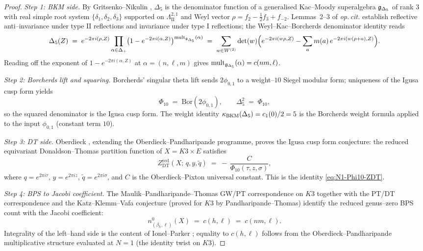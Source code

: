 \begin{proof}
\emph{Step 1: BKM side.} By Gritsenko--Nikulin \cite{GritsenkoNikulin1995, GritsenkoNikulin1998},
$\Delta_5$ is the denominator function of a generalised Kac--Moody superalgebra
$\mathfrak{g}_{\Delta_5}$ of rank $3$ with real simple root system $\{\delta_1, \delta_2, \delta_3\}$
supported on $\Lambda^{2,1}_{\mathrm{II}}$ and Weyl vector $\rho = f_2 - \tfrac12 f_3 + f_{-2}$.
Lemmas~2--3 of \emph{op.\,cit.} establish reflective anti--invariance under type
$\mathrm{II}$ reflections and invariance under type $\mathrm{I}$ reflections;
the Weyl--Kac--Borcherds denominator identity reads
\[
\Delta_5(Z) \;=\; e^{-2\pi i(\rho, Z)} \prod_{\alpha \in \Delta_+}\bigl(1 - e^{-2\pi i(\alpha, Z)}\bigr)^{\mathrm{mult}_{\mathfrak{g}_{\Delta_5}}(\alpha)}
\;=\; \sum_{w \in W^{(2)}}\mathrm{det}(w)\Bigl(e^{-2\pi i(w\rho, Z)} - \sum_a m(a)\, e^{-2\pi i (w(\rho + a), Z)}\Bigr).
\]
Reading off the exponent of $1 - e^{-2\pi i(\alpha, Z)}$ at
$\alpha = (n, \ell, m)$ gives $\mathrm{mult}_{\mathfrak{g}_{\Delta_5}}(\alpha) = c(nm, \ell)$.

\emph{Step 2: Borcherds lift and squaring.} Borcherds' singular theta lift
\cite[Thm~13.3]{Borcherds1998} sends $2\phi_{0,1}$ to a weight--$10$ Siegel
modular form; uniqueness of the Igusa cusp form yields
\[
\Phi_{10} \;=\; \mathrm{Bor}(2 \phi_{0,1}), \qquad \Delta_5^2 \;=\; \Phi_{10},
\]
so the squared denominator is the Igusa cusp form. The weight identity
$\kappa_{\mathrm{BKM}}(\Delta_5) = c_1(0)/2 = 5$ is the Borcherds weight formula applied to the
input $\phi_{0,1}$ (constant term $10$).

\emph{Step 3: DT side.} Oberdieck \cite{Oberdieck2018}, extending the
Oberdieck--Pandharipande programme, proves the Igusa cusp form conjecture: the
reduced equivariant Donaldson--Thomas partition function of $X = K3 \times E$
satisfies
\[
Z^{\mathrm{red}}_{\mathrm{DT}}(X;\, q, y, \widetilde q) \;=\; -\,\frac{C}{\Phi_{10}(\tau, z, \sigma)},
\]
where $q = e^{2\pi i \tau}$, $y = e^{2\pi i z}$, $\widetilde q = e^{2\pi i \sigma}$,
and $C$ is the Oberdieck--Pixton universal constant. This is the identity
\eqref{eq:N1-Phi10-ZDT}.

\emph{Step 4: BPS to Jacobi coefficient.} The Maulik--Pandharipande--Thomas
GW/PT correspondence on $K3$ \cite{MPT2010} together with the PT/DT correspondence
\cite{PT2014} and the Katz--Klemm--Vafa conjecture (proved for $K3$ by
Pandharipande--Thomas) identify the reduced genus--zero BPS count with the
Jacobi coefficient:
\[
n^0_{(\beta_h, \ell)}(X) \;=\; c(h, \ell) \;=\; c(nm, \ell).
\]
Integrality of the left--hand side is the content of Ionel--Parker
\cite{IonelParker2018}; equality to $c(h, \ell)$ follows from the Oberdieck--Pandharipande
multiplicative structure evaluated at $N = 1$ (the identity twist on $K3$).


\end{proof}
